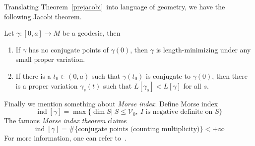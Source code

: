 Translating Theorem~\ref{prejacobi}~into language of geometry, we have the following Jacobi theorem.
\begin{thm}[Jacobi]
    Let $\gamma:[0,a]\to M$ be a geodesic, then
    \begin{enumerate}[(1)]
        \item If $\gamma$ has no conjugate points of $\gamma(0)$, then $\gamma$ is length-minimizing under any small proper variation.
        \item If there is a $t_0\in(0,a)$ such that $\gamma(t_0)$ is conjugate to $\gamma(0)$, then there is a proper variation $\gamma_s(t)$ such that $L[\gamma_s]<L[\gamma]$ for all $s$.
    \end{enumerate}
\end{thm}

Finally we mention something about \emph{Morse index}.
Define Morse index
\[\operatorname{ind}[\gamma]=\max\{\dim S|\ S\leq\mathscr{V}_0,\ I\text{ is negative definite on }S\}\]
The famous \emph{Morse index theorem} claims
\[\operatorname{ind}[\gamma]=\#\{\text{conjugate points (counting multiplicity)}\}<+\infty\]
For more information, one can refer to~\cite{Milnor}.